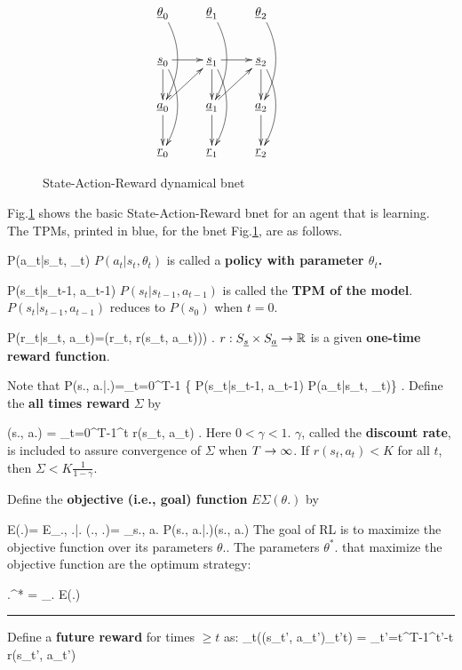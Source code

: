 \begin{figure}
\centering
$$\xymatrix{
\rvtheta_0\ar@/^1pc/[dd]&
\rvtheta_1\ar@/^1pc/[dd]&
\rvtheta_2\ar@/^1pc/[dd]&\\
\rvs_0\ar[r]\ar[d]\ar@/^1pc/[dd]&
\rvs_1\ar[r]\ar[d]\ar@/^1pc/[dd]&
\rvs_2\ar[d]\ar@/^1pc/[dd]\\
\rva_0\ar[ur]\ar[d]&
\rva_1\ar[ur]\ar[d]&
\rva_2\ar[d]
\\
\rvr_0&
\rvr_1&
\rvr_2
}$$
\caption{State-Action-Reward dynamical bnet}
\label{fig-basic-rl}
\end{figure}

Fig.\ref{fig-basic-rl} shows
the basic State-Action-Reward bnet
for an agent that is learning.
The TPMs, printed in blue, for the
bnet Fig.\ref{fig-basic-rl}, are
as follows.

\beq\color{blue}P(a_t|s_t, \theta_t)
\eeq
 $P(a_t|s_t, \theta_t)$ is called  a
{\bf policy with parameter $\theta_t$.} 

\beq\color{blue}P(s_{t}|s_{t-1}, a_{t-1})
\eeq
$P(s_t|s_{t-1}, a_{t-1})$ is called the
 {\bf TPM of the model}.
$P(s_t|s_{t-1}, a_{t-1})$ reduces to $P(s_0)$ when $t=0$.

\beq\color{blue}
P(r_t|s_t, a_t)=\delta(r_t, r(s_t, a_t)))
\;.\eeq
$r:S_{\underline{s}}\times S_{\underline{a}}\rightarrow { \mathbb{R}}$ 
is a given
 {\bf one-time reward function}.


Note that 
\beq
P(s., a.|\theta.)=\prod_{t=0}^{T-1}
\{
P(s_t|s_{t-1}, a_{t-1})
P(a_t|s_t, \theta_t)\}
\;.
\eeq
Define the {\bf all times reward} 
$\Sigma$ by

\beq
\Sigma(s., a.) = 
\sum_{t=0}^{T-1}\gamma^t r(s_t, a_t)
\;.
\eeq
Here $0<\gamma<1$. 
$\gamma$, called the {\bf discount rate},
is included to assure 
convergence of $\Sigma$ when
$T\rightarrow \infty$. 
If $r(s_t, a_t)< K$ for all $t$, then
$\Sigma< K \frac{1}{1-\gamma}$.

Define the {\bf objective (i.e., goal)
 function}
$E\Sigma(\theta.)$ by

\beq
E\Sigma(\theta.)=
E_{\rvs., \rva.|\theta.}
\Sigma(\rvs., \rva.)=
\sum_{s., a.}
P(s., a.|\theta.)\Sigma(s., a.)
\eeq
The goal of RL  is to
maximize the 
objective function over
its parameters $\theta.$.
The parameters $\theta^*.$ that 
maximize the objective function 
are the optimum strategy:

\beq 
\theta.^* = \argmax_{\theta.}
E\Sigma(\theta.)
\eeq

\hrule
Define a {\bf future reward} for
 times $\geq t$ as:
\beq
\Sigma_{\geq t}((s_{t'},
 a_{t'})_{t'\geq t}) =
 \sum_{t'=t}^{T-1}\gamma^{t'-t} r(s_{t'}, a_{t'})
\eeq

